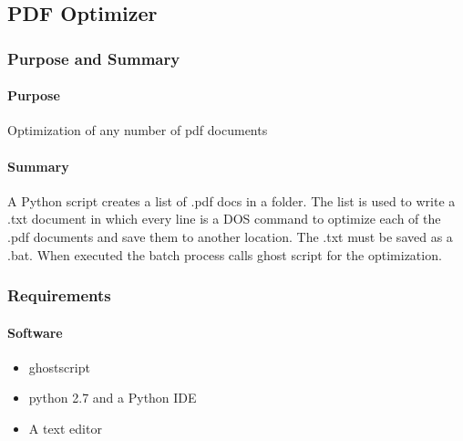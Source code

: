 %
%
%
%
% 
\subsection{PDF Optimizer}
\subsubsection{Purpose and Summary}

\paragraph{Purpose} Optimization of any number of pdf documents
%
\paragraph{Summary} A Python script creates a list of .pdf docs in a folder.  The list is used to write a .txt document in which every line is a DOS command to optimize each of the .pdf documents and save them to another location.  The .txt must be saved as a .bat.  When executed the batch process calls ghost script for the optimization.

\subsubsection{Requirements}
\paragraph{Software}
\begin{itemize}
\item ghostscript
\item python 2.7 and a Python IDE
\item A text editor
\end{itemize}



